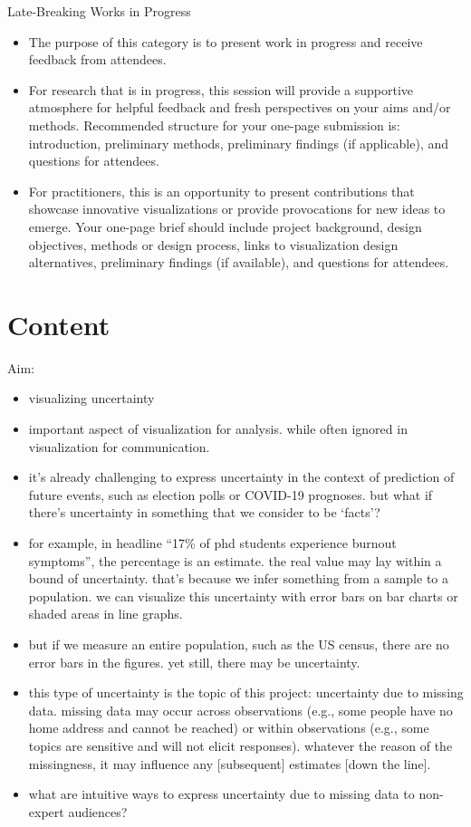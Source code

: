 \documentclass[
]{article}
\begin{document}
Late-Breaking Works in Progress

\begin{itemize}
\item
  The purpose of this category is to present work in progress and
  receive feedback from attendees.
\item
  For research that is in progress, this session will provide a
  supportive atmosphere for helpful feedback and fresh perspectives on
  your aims and/or methods. Recommended structure for your one-page
  submission is: introduction, preliminary methods, preliminary findings
  (if applicable), and questions for attendees.
\item
  For practitioners, this is an opportunity to present contributions
  that showcase innovative visualizations or provide provocations for
  new ideas to emerge. Your one-page brief should include project
  background, design objectives, methods or design process, links to
  visualization design alternatives, preliminary findings (if
  available), and questions for attendees.
\end{itemize}

\hypertarget{content}{%
\section{Content}\label{content}}

Aim:

\begin{itemize}
\item
  visualizing uncertainty
\item
  important aspect of visualization for analysis. while often ignored in
  visualization for communication.
\item
  it's already challenging to express uncertainty in the context of
  prediction of future events, such as election polls or COVID-19
  prognoses. but what if there's uncertainty in something that we
  consider to be `facts'?
\item
  for example, in headline ``17\% of phd students experience burnout
  symptoms'', the percentage is an estimate. the real value may lay
  within a bound of uncertainty. that's because we infer something from
  a sample to a population. we can visualize this uncertainty with error
  bars on bar charts or shaded areas in line graphs.
\item
  but if we measure an entire population, such as the US census, there
  are no error bars in the figures. yet still, there may be uncertainty.
\item
  this type of uncertainty is the topic of this project: uncertainty due
  to missing data. missing data may occur across observations (e.g.,
  some people have no home address and cannot be reached) or within
  observations (e.g., some topics are sensitive and will not elicit
  responses). whatever the reason of the missingness, it may influence
  any {[}subsequent{]} estimates {[}down the line{]}.
\item
  what are intuitive ways to express uncertainty due to missing data to
  non-expert audiences?
\end{itemize}
\end{document}
